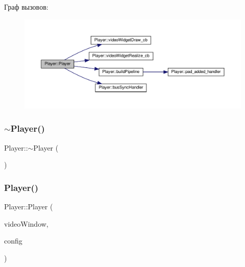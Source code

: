 Граф вызовов\+:\nopagebreak
\begin{figure}[H]
\begin{center}
\leavevmode
\includegraphics[width=350pt]{class_player_a0e17f3ec3397aa056d2ee88a060a7d36_cgraph}
\end{center}
\end{figure}
\mbox{\label{class_player_a749d2c00e1fe0f5c2746f7505a58c062}} 
\subsubsection{\texorpdfstring{$\sim$\+Player()}{~Player()}\hspace{0.1cm}{\footnotesize\ttfamily [1/2]}}
{\footnotesize\ttfamily Player\+::$\sim$\+Player (\begin{DoxyParamCaption}{ }\end{DoxyParamCaption})}

\mbox{\label{class_player_a4b179b1c59f780f59e215fa5642acb99}} 
\subsubsection{\texorpdfstring{Player()}{Player()}\hspace{0.1cm}{\footnotesize\ttfamily [2/2]}}
{\footnotesize\ttfamily Player\+::\+Player (\begin{DoxyParamCaption}\item[{Gtk\+Widget $\ast$}]{video\+Window,  }\item[{\hyperlink{class_config}{Config} $\ast$}]{config }\end{DoxyParamCaption})}

